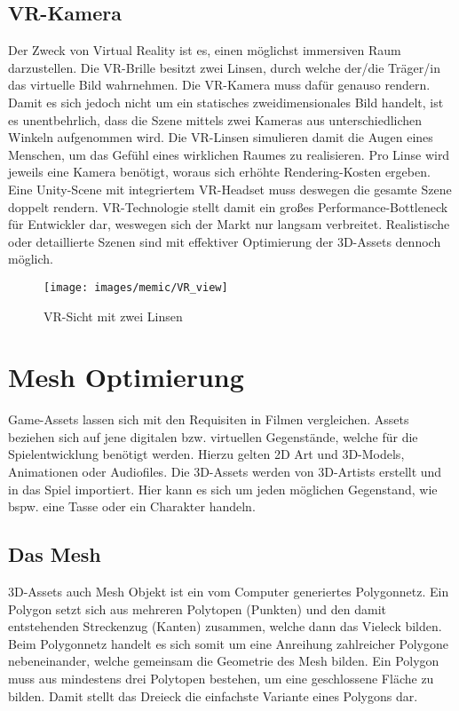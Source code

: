 \subsection{VR-Kamera}

Der Zweck von Virtual Reality ist es, einen möglichst immersiven Raum darzustellen. Die VR-Brille besitzt zwei Linsen, durch welche der/die Träger/in das virtuelle Bild wahrnehmen. Die VR-Kamera muss dafür genauso rendern. Damit es sich jedoch nicht um ein statisches zweidimensionales Bild handelt, ist es unentbehrlich, dass die Szene mittels zwei Kameras aus unterschiedlichen Winkeln aufgenommen wird. Die VR-Linsen simulieren damit die Augen eines Menschen, um das Gefühl eines wirklichen Raumes zu realisieren. Pro Linse wird jeweils eine Kamera benötigt, woraus sich erhöhte Rendering-Kosten ergeben. Eine Unity-Scene mit integriertem VR-Headset muss deswegen die gesamte Szene doppelt rendern. VR-Technologie stellt damit ein großes Performance-Bottleneck für Entwickler dar, weswegen sich der Markt nur langsam verbreitet. Realistische oder detaillierte Szenen sind mit effektiver Optimierung der 3D-Assets dennoch möglich.
\begin{figure}[H]
	\centering
	\texttt{[image: images/memic/VR\_view]}
	\caption{VR-Sicht mit zwei Linsen}
\end{figure}
\cite{_vrview}

\section{Mesh Optimierung}

Game-Assets lassen sich mit den Requisiten in Filmen vergleichen. Assets beziehen sich auf jene digitalen bzw. virtuellen Gegenstände, welche für die Spielentwicklung benötigt werden. Hierzu gelten 2D Art und 3D-Models, Animationen oder Audiofiles. Die 3D-Assets werden von 3D-Artists erstellt und in das Spiel importiert. Hier kann es sich um jeden möglichen Gegenstand, wie bspw. eine Tasse oder ein Charakter handeln.\cite{_unity_game_optimization}

\subsection{Das Mesh}

3D-Assets auch Mesh Objekt ist ein vom Computer generiertes Polygonnetz. Ein Polygon setzt sich aus mehreren Polytopen (Punkten) und den damit entstehenden Streckenzug (Kanten) zusammen, welche dann das Vieleck bilden. Beim Polygonnetz handelt es sich somit um eine Anreihung zahlreicher Polygone nebeneinander, welche gemeinsam die Geometrie des Mesh bilden. Ein Polygon muss aus mindestens drei Polytopen bestehen, um eine geschlossene Fläche zu bilden. Damit stellt das Dreieck die einfachste Variante eines Polygons dar.\cite{_the_essential_guide_to_3D}

